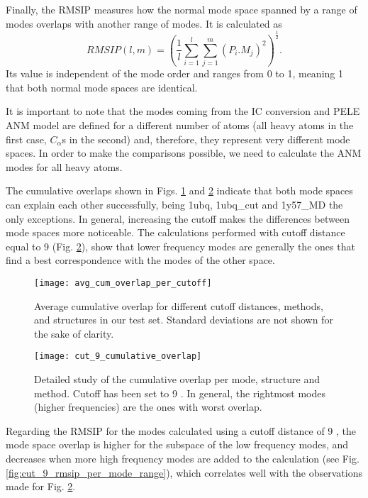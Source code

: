 Finally, the RMSIP \cite{amadei_convergence_1999,leo-macias_analysis_2005} measures how the normal mode space spanned by a range of modes overlaps with another range of modes. It is calculated as  
\begin{equation}
RMSIP(l,m) = \left( \frac{1}{l} \sum_{i=1}^l \sum_{j=1}^m {(P_i.M_j)}^2 \right )^\frac{1}{2} .
\end{equation}
Its value is independent of the mode order and ranges from 0 to 1, meaning 1 that both normal mode spaces are identical.

It is important to note that the modes coming from the IC conversion and PELE ANM model are defined for a different number of atoms (all heavy atoms in the first case, $C_\alpha$s in the second) and, therefore, they represent very different mode spaces. In order to make the comparisons possible, we need to calculate the ANM modes for all heavy atoms.

The cumulative overlaps shown in Figs. \ref{fig:avg_cum_overlap_per_cutoff} and \ref{fig:cut_9_cumulative_overlap} indicate that both mode spaces can explain each other successfully, being 1ubq, 1ubq\_cut and 1y57\_MD the only exceptions. In general, increasing the cutoff makes the differences between mode spaces more noticeable. The calculations performed with cutoff distance equal to 9 \angstrom (Fig. \ref{fig:cut_9_cumulative_overlap}), show that lower frequency modes are generally the ones that find a best correspondence with the modes of the other space.

\begin{figure}
\texttt{[image: avg\_cum\_overlap\_per\_cutoff]}
\caption{ Average cumulative overlap for different cutoff distances, methods, and structures in our test set. Standard deviations are not shown for the sake of clarity.}
\label{fig:avg_cum_overlap_per_cutoff}
\end{figure}
 
\begin{figure}
\texttt{[image: cut\_9\_cumulative\_overlap]}
\caption{Detailed study of the cumulative overlap per mode, structure and method. Cutoff has been set to 9 \angstrom. In general, the rightmost modes (higher frequencies) are the ones with worst overlap.} 
\label{fig:cut_9_cumulative_overlap}
\end{figure}

Regarding the RMSIP for the modes calculated using a cutoff distance of 9 \angstrom, the mode space overlap is higher for the subspace of the low frequency modes, and decreases when more high frequency modes are added to the calculation (see Fig. \ref{fig:cut_9_rmsip_per_mode_range}), which correlates well with the observations made for Fig. \ref{fig:cut_9_cumulative_overlap}.

